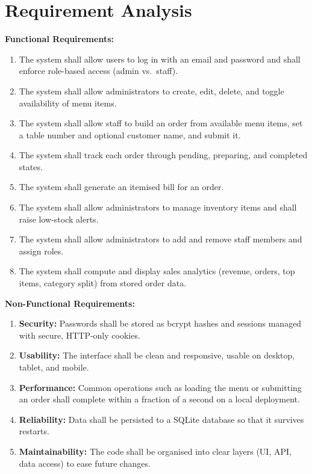 \documentclass[12pt,a4paper]{report}
\begin{document}
\section{Requirement Analysis}
\textbf{Functional Requirements:}
\begin{enumerate}
  \item The system shall allow users to log in with an email and password and shall enforce
        role-based access (admin vs.\ staff).
  \item The system shall allow administrators to create, edit, delete, and toggle availability
        of menu items.
  \item The system shall allow staff to build an order from available menu items, set a table
        number and optional customer name, and submit it.
  \item The system shall track each order through pending, preparing, and completed states.
  \item The system shall generate an itemised bill for an order.
  \item The system shall allow administrators to manage inventory items and shall raise
        low-stock alerts.
  \item The system shall allow administrators to add and remove staff members and assign roles.
  \item The system shall compute and display sales analytics (revenue, orders, top items,
        category split) from stored order data.
\end{enumerate}

\textbf{Non-Functional Requirements:}
\begin{enumerate}
  \item \textbf{Security:} Passwords shall be stored as bcrypt hashes and sessions managed with
        secure, HTTP-only cookies.
  \item \textbf{Usability:} The interface shall be clean and responsive, usable on desktop,
        tablet, and mobile.
  \item \textbf{Performance:} Common operations such as loading the menu or submitting an order
        shall complete within a fraction of a second on a local deployment.
  \item \textbf{Reliability:} Data shall be persisted to a SQLite database so that it survives
        restarts.
  \item \textbf{Maintainability:} The code shall be organised into clear layers (UI, API, data
        access) to ease future changes.
\end{enumerate}
\end{document}
